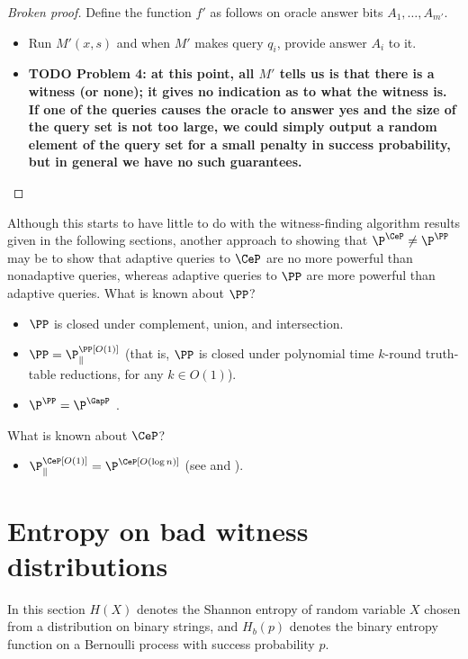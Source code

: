 \documentclass{article}
\newcommand{\todo}[1]{\textbf{TODO #1}}
\begin{document}
\begin{proof}[Broken proof]
  Define the function $f'$ as follows on oracle answer bits $A_1, \dotsc, A_{m'}$.
  \begin{itemize}
  \item Run $M'(x, s)$ and when $M'$ makes query $q_i$, provide answer $A_i$ to it.
  \item \todo{Problem 4: at this point, all $M'$ tells us is that there is a witness (or none); it gives no indication as to what the witness is.
    If one of the queries causes the oracle to answer yes and the size of the query set is not too large, we could simply output a random element of the query set for a small penalty in success probability, but in general we have no such guarantees.}\qedhere
  \end{itemize}
\end{proof}

Although this starts to have little to do with the witness-finding algorithm results given in the following sections, another approach to showing that $\P^{\CeP} \neq \P^\PP$ may be to show that adaptive queries to $\CeP$ are no more powerful than nonadaptive queries, whereas adaptive queries to $\PP$ are more powerful than adaptive queries.
What is known about $\PP$?
\begin{itemize}
\item $\PP$ is closed under complement, union, and intersection.
\item $\PP = \P^{\PP[O(1)]}_\parallel$ (that is, $\PP$ is closed under polynomial time $k$-round truth-table reductions, for any $k \in O(1)$).
\item $\P^{\PP} = \P^{\GapP}$ \autocite[Theorem~4.14]{fortnow97}.
\end{itemize}
What is known about $\CeP$?
\begin{itemize}
\item $\P^{\CeP[O(1)]}_\parallel = \P^{\CeP[O(\log n)]}$ (see \autocite[Theorem~5]{green93} and \autocite[Corollary~4.6]{ogiwara94}).
\end{itemize}

\section{Entropy on bad witness distributions}

In this section $H(X)$ denotes the Shannon entropy of random variable $X$ chosen from a distribution on binary strings, and $H_b(p)$ denotes the binary entropy function on a Bernoulli process with success probability $p$.
\end{document}
